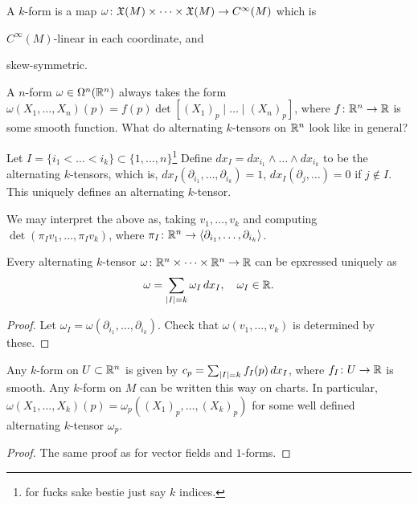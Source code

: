 \begin{definition}[Formal, \S7.20]
    A $k$-form is a map $\omega \colon \mathfrak X(M) \times \dots \times \mathfrak X(M) \to C^\infty(M)$ which is \begin{parlist} $C^\infty(M)$-linear in each coordinate, and \item skew-symmetric. \end{parlist}
\end{definition}
A $n$-form $\omega \in \Omega^n(\mathbb R^n)$ always takes the form $\omega(X_1, \dots, X_n)(p) = f(p) \det [(X_1)_p \mid \dots \mid (X_n)_p]$, where $f \colon \mathbb R^n \to \mathbb R$ is some smooth function. What do alternating $k$-tensors on $\mathbb R^n$ look like in general?
\begin{definition}
    Let $I = \{i_1 < \dots < i_k\} \subset \{1, \dots, n\}$\footnote{for fucks sake bestie just say $k$ indices.} Define $dx_I = dx_{i_1} \wedge \dots \wedge dx_{i_k}$ to be the alternating $k$-tensors, which is, $dx_I(\partial_{i_1}, \dots, \partial_{i_k}) = 1$, $dx_I(\partial_{j}, \dots) = 0$ if $j \notin I$. This uniquely defines an alternating $k$-tensor.
\end{definition}
We may interpret the above as, taking $v_1, \dots, v_k$ and computing $\det(\pi_I v_1, \dots, \pi_I v_k)$, where $\pi_I \colon \mathbb R^n \to \left<\partial_{i_1}, \dots, \partial_{i_k}\right>$.
\begin{lemma}
    Every alternating $k$-tensor $\omega \colon \mathbb R^n \times \dots \times \mathbb R^n \to \mathbb R$ can be epxressed uniquely as
    \[ \omega = \sum_{\left\lvert I \right\rvert = k} \omega_I \, dx_I, \quad \omega_I \in \mathbb R. \]
\end{lemma}
\begin{proof}
    Let $\omega_I = \omega(\partial_{i_1}, \dots, \partial_{i_k})$. Check that $\omega(v_1, \dots, v_k)$ is determined by these.
\end{proof}
\begin{proposition}
    
\end{proposition}
Any $k$-form on $U \subset \mathbb R^n$ is given by $c_p = \sum_{\left\lvert I \right\rvert = k} f_I(p) \, dx_I$, where $f_I \colon U \to \mathbb R$ is smooth. Any $k$-form on $M$ can be written this way on  charts. In particular, $\omega(X_1, \dots, X_k)(p) = \omega_p((X_1)_p, \dots, (X_k)_p)$ for some well defined alternating $k$-tensor $\omega_p$.
\begin{proof}
    The same proof as for vector fields and $1$-forms.
\end{proof}